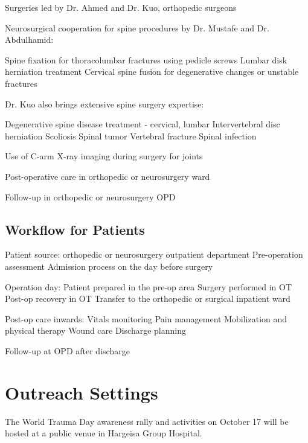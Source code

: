 \documentclass{article}
\begin{document}
\begin{outline}
\1 Surgeries led by Dr. Ahmed and Dr. Kuo, orthopedic surgeons

\1 Neurosurgical cooperation for spine procedures by Dr. Mustafe and Dr. Abdulhamid:

    \2 Spine fixation for thoracolumbar fractures using pedicle screws
    \2 Lumbar disk herniation treatment
    \2 Cervical spine fusion for degenerative changes or unstable fractures

\1 Dr. Kuo also brings extensive spine surgery expertise:

    \2 Degenerative spine disease treatment - cervical, lumbar
    \2 Intervertebral disc herniation
    \2 Scoliosis
    \2 Spinal tumor
    \2 Vertebral fracture
    \2 Spinal infection

\1 Use of C-arm X-ray imaging during surgery for joints

\1 Post-operative care in orthopedic or neurosurgery ward

\1 Follow-up in orthopedic or neurosurgery OPD
\end{outline}





\subsection{Workflow for Patients}

\begin{outline}
\1 Patient source: orthopedic or neurosurgery outpatient department
\2 Pre-operation assessment
\2 Admission process on the day before surgery

\1 Operation day:
\2 Patient prepared in the pre-op area
\2 Surgery performed in OT
\2 Post-op recovery in OT
\2 Transfer to the orthopedic or surgical inpatient ward

\1 Post-op care inwards:
\2 Vitals monitoring
\2 Pain management
\2 Mobilization and physical therapy
\2 Wound care
\2 Discharge planning

\1 Follow-up at OPD after discharge

\end{outline}




\clearpage
\section{Outreach Settings}
The World Trauma Day awareness rally and activities on October 17 will be hosted at a public venue in Hargeisa Group Hospital. %
\end{document}
